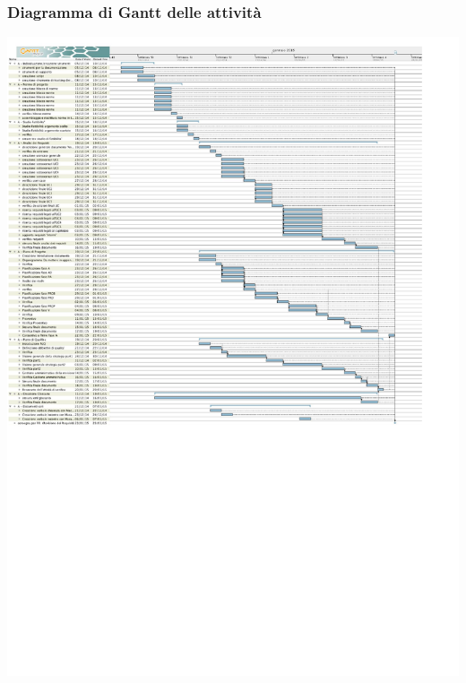 	\subsubsection{Diagramma di Gantt delle attività}
		\includegraphics{PianoDiProgetto/Pics/FaseA.pdf}
